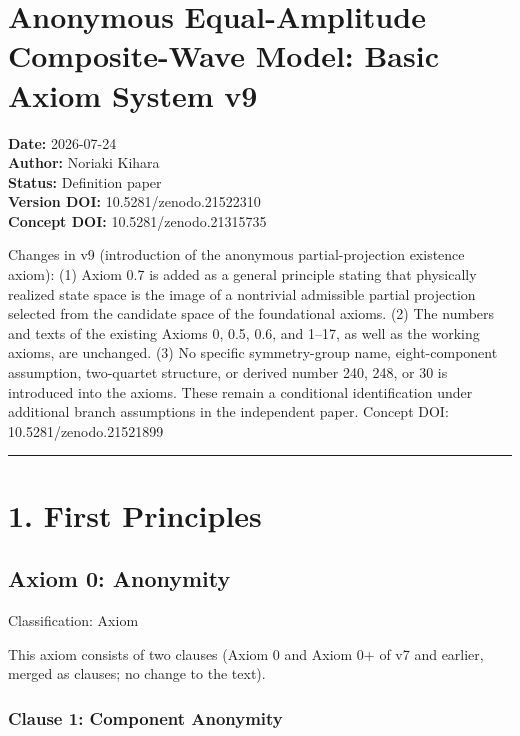 \documentclass[
  a4paper,
]{article}
\author{}
\date{}
\begin{document}
\section{Anonymous Equal-Amplitude Composite-Wave Model: Basic Axiom
System
v9}\label{anonymous-equal-amplitude-composite-wave-model-basic-axiom-system-v9}

\textbf{Date:} 2026-07-24\\
\textbf{Author:} Noriaki Kihara\\
\textbf{Status:} Definition paper\\
\textbf{Version DOI:} 10.5281/zenodo.21522310\\
\textbf{Concept DOI:} 10.5281/zenodo.21315735

Changes in v9 (introduction of the anonymous partial-projection
existence axiom): (1) Axiom 0.7 is added as a general principle stating
that physically realized state space is the image of a nontrivial
admissible partial projection selected from the candidate space of the
foundational axioms. (2) The numbers and texts of the existing Axioms 0,
0.5, 0.6, and 1--17, as well as the working axioms, are unchanged. (3)
No specific symmetry-group name, eight-component assumption, two-quartet
structure, or derived number 240, 248, or 30 is introduced into the
axioms. These remain a conditional identification under additional
branch assumptions in the independent paper. Concept DOI:
10.5281/zenodo.21521899

\begin{center}\rule{0.5\linewidth}{0.5pt}\end{center}

\section{1. First Principles}\label{first-principles}

\subsection{Axiom 0: Anonymity}\label{axiom-0-anonymity}

Classification: Axiom

This axiom consists of two clauses (Axiom 0 and Axiom 0+ of v7 and
earlier, merged as clauses; no change to the text).

\subsubsection{Clause 1: Component
Anonymity}\label{clause-1-component-anonymity}
\end{document}
